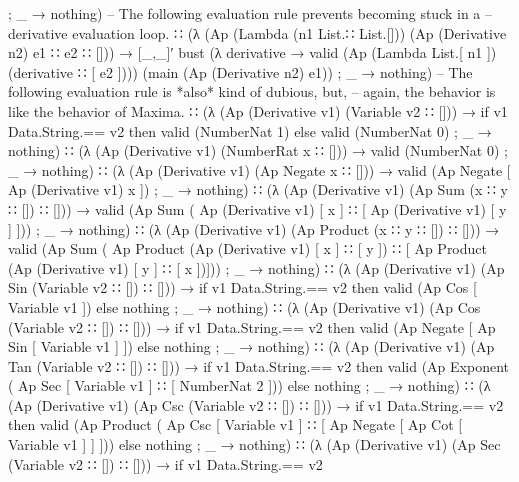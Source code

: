 \documentclass{report}
\begin{document}
\begin{code}
{           ; _ → nothing})
      -- The following evaluation rule prevents becoming stuck in a
      -- derivative evaluation loop.
      ∷ (λ { (Ap (Lambda (n1 List.∷ List.[])) (Ap (Derivative n2) e1 ∷ e2 ∷ [])) →
             [_,_]′ bust
                    (λ derivative → valid (Ap (Lambda List.[ n1 ])
                                              (derivative ∷ [ e2 ])))
                    (main (Ap (Derivative n2) e1))
           ; _ → nothing})
      -- The following evaluation rule is *also* kind of dubious, but,
      -- again, the behavior is like the behavior of Maxima.
      ∷ (λ { (Ap (Derivative v1) (Variable v2 ∷ [])) →
             if v1 Data.String.== v2
               then valid (NumberNat 1)
               else valid (NumberNat 0)
           ; _ → nothing})
      ∷ (λ { (Ap (Derivative v1) (NumberRat x ∷ [])) →
             valid (NumberNat 0)
           ; _ → nothing})
      ∷ (λ { (Ap (Derivative v1) (Ap Negate x ∷ [])) →
             valid (Ap Negate [ Ap (Derivative v1) x ])
           ; _ → nothing})
      ∷ (λ { (Ap (Derivative v1) (Ap Sum (x ∷ y ∷ []) ∷ [])) →
             valid (Ap Sum ( Ap (Derivative v1) [ x ]
                           ∷ [ Ap (Derivative v1) [ y ] ]))
           ; _ → nothing})
      ∷ (λ { (Ap (Derivative v1) (Ap Product (x ∷ y ∷ []) ∷ [])) →
             valid (Ap Sum
                       ( Ap Product (Ap (Derivative v1) [ x ] ∷ [ y ])
                       ∷ [ Ap Product (Ap (Derivative v1) [ y ] ∷ [ x ])]))
           ; _ → nothing})
      ∷ (λ { (Ap (Derivative v1) (Ap Sin (Variable v2 ∷ []) ∷ [])) →
             if v1 Data.String.== v2
               then valid (Ap Cos [ Variable v1 ])
               else nothing
           ; _ → nothing})
      ∷ (λ { (Ap (Derivative v1) (Ap Cos (Variable v2 ∷ []) ∷ [])) →
             if v1 Data.String.== v2
               then valid (Ap Negate [ Ap Sin [ Variable v1 ] ])
               else nothing
           ; _ → nothing})
      ∷ (λ { (Ap (Derivative v1) (Ap Tan (Variable v2 ∷ []) ∷ [])) →
             if v1 Data.String.== v2
               then valid (Ap Exponent ( Ap Sec [ Variable v1 ] ∷ [ NumberNat 2 ]))
               else nothing
           ; _ → nothing})
      ∷ (λ { (Ap (Derivative v1) (Ap Csc (Variable v2 ∷ []) ∷ [])) →
             if v1 Data.String.== v2
               then valid (Ap Product
                              ( Ap Csc [ Variable v1 ]
                              ∷ [ Ap Negate [ Ap Cot [ Variable v1 ] ] ]))
               else nothing
           ; _ → nothing})
      ∷ (λ { (Ap (Derivative v1) (Ap Sec (Variable v2 ∷ []) ∷ [])) →
             if v1 Data.String.== v2
}
\end{code}
\end{document}
